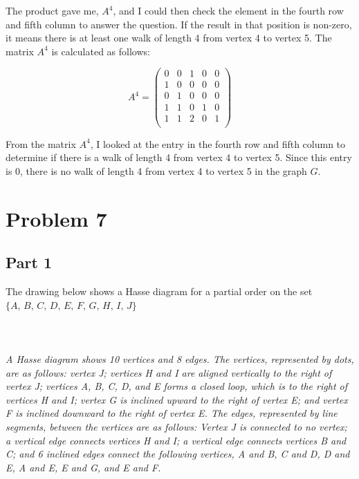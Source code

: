 \documentclass{amsart}
\theoremstyle{definition}
\theoremstyle{Exercise}
\theoremstyle{remark}
\theoremstyle{rule}
\numberwithin{equation}{section}
\begin{document}
\begin{enumerate}[label=(\alph*)]
The product gave me, \( A^4 \), and I could then check the element in the fourth row and fifth column to answer the question. If the result in that position is non-zero, it means there is at least one walk of length 4 from vertex 4 to vertex 5.
The matrix \( A^4 \) is calculated as follows:

\[
A^4  = \begin{pmatrix}
0 & 0 & 1 & 0 & 0 \\
1 & 0 & 0 & 0 & 0 \\
0 & 1 & 0 & 0 & 0 \\
1 & 1 & 0 & 1 & 0 \\
1 & 1 & 2 & 0 & 1 \\
\end{pmatrix}
\]

From the matrix \( A^4 \), I looked at the entry in the fourth row and fifth column to determine if there is a walk of length 4 from vertex 4 to vertex 5. Since this entry is 0, there is no walk of length 4 from vertex 4 to vertex 5 in the graph \( G \).

\end{enumerate}

 \newpage

\section*{Problem 7}
\subsection*{Part 1} The drawing below shows a Hasse diagram for a partial order on the set $\{A,\, B,\, C,\, D,\, E,\, F,\, G,\, H,\, I,\, J\}$
\\
\\
\\
\\
{\color{blue}{\bf Figure 3:} \emph{A Hasse diagram shows 10 vertices and 8 edges. The vertices, represented by dots, are as follows: vertex J; vertices H and I are aligned vertically to the right of vertex J; vertices A, B, C, D, and E forms a closed loop, which is to the right of vertices H and I; vertex G is inclined upward to the right of vertex E; and vertex F is inclined downward to the right of vertex E. The edges, represented by line segments, between the vertices are as follows: Vertex J is connected to no vertex; a vertical edge connects vertices H and I; a vertical edge connects vertices B and C; and 6 inclined edges connect the following vertices, A and B, C and D, D and E, A and E, E and G, and E and F.
}
}
\\
\\
\end{document}
